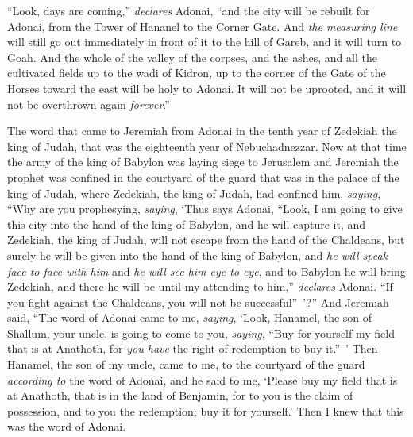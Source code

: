 \begin{biblechapter}
\verse “Look, days are coming,” \textit{declares} Adonai, “and the city will be rebuilt for Adonai, from the Tower of Hananel to the Corner Gate.
\verse And \textit{the measuring line} will still go out immediately in front of it to the hill of Gareb, and it will turn to Goah.
\verse And the whole of the valley of the corpses, and the ashes, and all the cultivated fields up to the wadi of Kidron, up to the corner of the Gate of the Horses toward the east will be holy to Adonai. It will not be uprooted, and it will not be overthrown again \textit{forever}.”
\end{biblechapter}

\begin{biblechapter} %
 The word that came to Jeremiah from Adonai in the tenth year of Zedekiah the king of Judah, that was the eighteenth year of Nebuchadnezzar.
\verse Now at that time the army of the king of Babylon was laying siege to Jerusalem and Jeremiah the prophet was confined in the courtyard of the guard that was in the palace of the king of Judah,
\verse where Zedekiah, the king of Judah, had confined him, \textit{saying}, “Why are you prophesying, \textit{saying}, ‘Thus says Adonai, “Look, I am going to give this city into the hand of the king of Babylon, and he will capture it,
\verse and Zedekiah, the king of Judah, will not escape from the hand of the Chaldeans, but surely he will be given into the hand of the king of Babylon, and \textit{he will speak face to face with him} and \textit{he will see him eye to eye},
\verse and to Babylon he will bring Zedekiah, and there he will be until my attending to him,” \textit{declares} Adonai. “If you fight against the Chaldeans, you will not be successful” ’?”
\verse And Jeremiah said, “The word of Adonai came to me, \textit{saying},
\verse ‘Look, Hanamel, the son of Shallum, your uncle, is going to come to you, \textit{saying}, “Buy for yourself my field that is at Anathoth, for \textit{you have} the right of redemption to buy it.” ’
\verse Then Hanamel, the son of my uncle, came to me, to the courtyard of the guard \textit{according to} the word of Adonai, and he said to me, ‘Please buy my field that is at Anathoth, that is in the land of Benjamin, for to you is the claim of possession, and to you the redemption; buy it for yourself.’ Then I knew that this was the word of Adonai.

\end{biblechapter}

